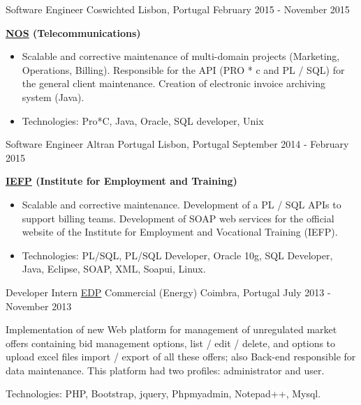 \begin{cventries}
\cventry
{Software Engineer} %
{Coswichted} %
{Lisbon, Portugal} %
{February 2015 - November 2015} %
{ %
\begin{cvitems}
\item { \textbf{\href{https://www.nos.pt/}{NOS} (Telecommunications)}}
\begin{itemize}
\item {Scalable and corrective maintenance of multi-domain projects (Marketing, Operations, Billing). Responsible for the API (PRO * c and PL / SQL) for the general client maintenance. Creation of electronic invoice archiving system (Java).}
\item {Technologies: Pro*C, Java, Oracle, SQL developer, Unix}
\end{itemize}
\end{cvitems}
}


\cventry
{Software Engineer} %
{Altran Portugal} %
{Lisbon, Portugal} %
{September 2014 - February 2015} %
{ %
\begin{cvitems}
\item { \textbf{\href{https://www.iefp.pt/}{IEFP} (Institute for Employment and Training)}}
\begin{itemize}
\item {Scalable and corrective maintenance. Development of a PL / SQL APIs to support billing teams. Development of SOAP web services for the official website of the Institute for Employment and Vocational Training (IEFP).}
\item{Technologies: PL/SQL, PL/SQL Developer, Oracle 10g, SQL Developer, Java, Eclipse, SOAP, XML, Soapui, Linux.}
\end{itemize}
\end{cvitems} 
}


\cventry
{Developer Intern} %
{\href{http://www.edp.pt/pt/Pages/homepage.aspx}{EDP} Commercial (Energy)} %
{Coimbra, Portugal} %
{July 2013 - November 2013} %
{ %
\begin{cvitems}
\item {Implementation of new Web platform for management of unregulated market offers containing bid management options, list / edit / delete, and options to upload excel files import / export of all these offers; also Back-end responsible for data maintenance. This platform had two profiles: administrator and user.}
\item{Technologies: PHP, Bootstrap, jquery, Phpmyadmin, Notepad++, Mysql.}
\end{cvitems}
}


\end{cventries}
